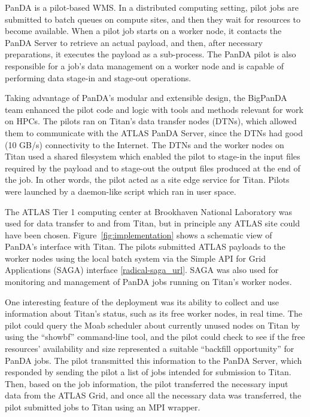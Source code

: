 PanDA is a pilot-based WMS. In a distributed computing setting, pilot jobs are
submitted to batch queues on compute sites, and then they wait for resources to
become available. When a pilot job starts on a worker node, it contacts the
PanDA Server to retrieve an actual payload, and then, after necessary
preparations, it executes the payload as a sub-process. The PanDA pilot is also
responsible for a job's data management on a worker node and is capable of
performing data stage-in and stage-out operations.

Taking advantage of PanDA's modular and extensible design, the BigPanDA team
enhanced the pilot code and logic with tools and methods relevant for work on
HPCs. The pilots ran on Titan's data transfer nodes (DTNs), which allowed them
to communicate with the ATLAS PanDA Server, since the DTNs had good (10 GB/s)
connectivity to the Internet. The DTNs and the worker nodes on Titan used a
shared filesystem which enabled the pilot to stage-in the input files required
by the payload and to stage-out the output files produced at the end of the
job. In other words, the pilot acted as a site edge service for Titan. Pilots
were launched by a daemon-like script which ran in user space.

The ATLAS Tier 1 computing center at Brookhaven National Laboratory was used
for data transfer to and from Titan, but in principle any ATLAS site could have
been chosen. Figure~\ref{fig:implementation} shows a schematic view of PanDA's
interface with Titan. The pilots submitted ATLAS payloads to the worker nodes
using the local batch system via the Simple API for Grid Applications (SAGA)
interface \ref{radical-saga_url}. SAGA was also used for monitoring and
management of PanDA jobs running on Titan's worker nodes.

One interesting feature of the deployment was its ability to collect and use
information about Titan's status, such as its free worker nodes, in real time.
The pilot could query the Moab scheduler about currently unused nodes on Titan
by using the ``showbf'' command-line tool, and the pilot could check to see if
the free resources' availability and size represented a suitable ``backfill
opportunity'' for PanDA jobs. The pilot transmitted this information to the
PanDA Server, which responded by sending the pilot a list of jobs intended for
submission to Titan. Then, based on the job information, the pilot transferred
the necessary input data from the ATLAS Grid, and once all the necessary data
was transferred, the pilot submitted jobs to Titan using an MPI wrapper. 

